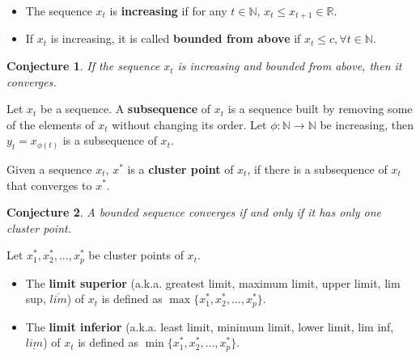 \documentclass[aspectratio=169, handout]{beamer}
\newtheorem{proposition}{Conjecture}[section]
\begin{document}
\begin{frame}
    \begin{definition}
    \begin{itemize}
        \item The sequence $x_t$ is \textbf{increasing} if for any $t\in\mathds{N}$, $x_t\leq x_{t+1}\in\mathds{R}$.
        \item If $x_t$ is increasing, it is called \textbf{bounded from above} if $x_t\leq c, \forall t\in\mathds{N}$.
    \end{itemize}
    \end{definition}
    
    \begin{proposition}
        If the sequence $x_t$ is increasing and bounded from above, then it converges.
    \end{proposition}
\end{frame}

\begin{frame}
    \begin{definition}
        Let $x_t$ be a sequence. A \textbf{subsequence} of $x_t$ is a sequence built by removing some of the elements of $x_t$ without changing its order. Let $\phi:\mathds{N}\rightarrow\mathds{N}$ be increasing, then $y_t=x_{\phi(t)}$ is a subsequence of $x_t$.
    \end{definition}
    
    \begin{definition}
        Given a sequence $x_t$, $x^*$ is a \textbf{cluster point} of $x_t$, if there is a subsequence of $x_t$ that converges to $x^*$.
    \end{definition}
\end{frame}

\begin{frame}
\begin{proposition}
    A bounded sequence converges if and only if it has only one cluster point.
\end{proposition}
    
\end{frame}

\begin{frame}

Let $x_1^*,x_2^*,...,x_p^*$ be cluster points of $x_t$.

\begin{definition}
\begin{itemize}
    \item The \textbf{limit superior} (a.k.a. greatest limit, maximum limit, upper limit, lim sup, $\overline{lim}$) of $x_t$ is defined as $\max\{x_1^*,x_2^*,...,x_p^*\}$.
    \item The \textbf{limit inferior} (a.k.a. least limit, minimum limit, lower limit, lim inf, $\underline{lim}$) of $x_t$ is defined as $\min\{x_1^*,x_2^*,...,x_p^*\}$.
\end{itemize}
\end{definition}
    
\end{frame}
\end{document}
